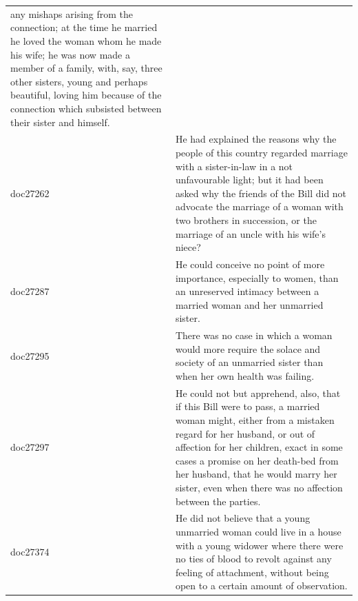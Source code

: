 \documentclass[
]{article}
\begin{document}
\begin{longtable}[t]{ll}
any mishaps arising from the connection; at the time he
married he loved the woman whom he made his wife; he was now
made a member of a family, with, say, three other sisters,
young and perhaps beautiful, loving him because of the
connection which subsisted between their sister and himself.\\
\addlinespace
doc27262 & He had explained the reasons why the people of this country
regarded marriage with a sister-in-law in a not unfavourable
light; but it had been asked why the friends of the Bill
did not advocate the marriage of a woman with two brothers
in succession, or the marriage of an uncle with his wife's
niece?\\
doc27287 & He could conceive no point of more importance, especially to
women, than an unreserved intimacy between a married woman
and her unmarried sister.\\
doc27295 & There was no case in which a woman would more require the
solace and society of an unmarried sister than when her own
health was failing.\\
doc27297 & He could not but apprehend, also, that if this Bill were to
pass, a married woman might, either from a mistaken regard
for her husband, or out of affection for her children, exact
in some cases a promise on her death-bed from her husband,
that he would marry her sister, even when there was no
affection between the parties.\\
doc27374 & He did not believe that a young unmarried woman could live
in a house with a young widower where there were no ties of
blood to revolt against any feeling of attachment, without
being open to a certain amount of observation.\\
\bottomrule
\end{longtable}
\end{document}

